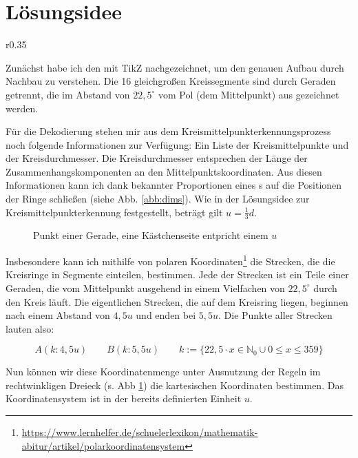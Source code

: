 \section{Lösungsidee}
\begin{wrapfigure}{r}{0.35\textwidth}
  \centering
  
  \caption{Geraden der Kreisringsegmente}
  \label{abb:spidergrafik}
\end{wrapfigure}
Zunächst habe ich den \task{} mit TikZ nachgezeichnet, um den genauen Aufbau durch Nachbau zu verstehen. Die 16 gleichgroßen Kreissegmente sind durch Geraden getrennt, die im Abstand von \(22,5^{\circ}\) vom Pol (dem Mittelpunkt) aus gezeichnet werden.

Für die Dekodierung stehen mir aus dem Kreismittelpunkterkennungsprozess noch folgende Informationen zur Verfügung: Ein Liste der Kreismittelpunkte und der Kreisdurchmesser. Die Kreisdurchmesser entsprechen der Länge der Zusammenhangskomponenten an den Mittelpunktskoordinaten. Aus diesen Informationen kann ich dank bekannter Proportionen eines \task{}s auf die Positionen der Ringe schließen (siehe Abb. \ref{abb:dims}). Wie in der Lösungsidee zur Kreismittelpunkterkennung festgestellt, beträgt gilt \(u=\frac{1}{3}d\).

\begin{figure}[!ht]
	\centering	
	
	\caption{Punkt einer Gerade, eine Kästchenseite entpricht einem \(u\)}
	\label{abb:trigon}
\end{figure}

Insbesondere kann ich mithilfe von polaren Koordinaten\footnote{\url{https://www.lernhelfer.de/schuelerlexikon/mathematik-abitur/artikel/polarkoordinatensystem}} die Strecken, die die Kreisringe in Segmente einteilen, bestimmen. Jede der Strecken ist ein Teile einer Geraden, die vom Mittelpunkt ausgehend in einem Vielfachen von \(22,5^{\circ}\) durch den Kreis läuft. Die eigentlichen Strecken, die auf dem Kreisring liegen, beginnen nach einem Abstand von \(4,5u\) und enden bei \(5,5u\). Die Punkte aller Strecken lauten also:

\begin{displaymath}
A(k:4,5u) \hspace{2em} B(k:5,5u) \hspace{2em} k := \{22,5 \cdot x \in \mathbb{N}_0 \cup 0 \le x \le 359\}
\end{displaymath}

Nun können wir diese Koordinatenmenge unter Ausnutzung der Regeln im rechtwinkligen Dreieck (s. Abb \ref{abb:trigon}) die kartesischen Koordinaten bestimmen. Das Koordinatensystem ist in der bereits definierten Einheit \(u\).

